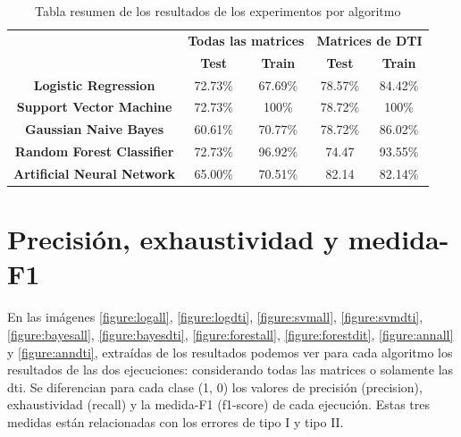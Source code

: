 \begin{table}[H]
\centering
\begin{tabular}{c|c|c|c|c|}
\cline{2-5}
                                        & \multicolumn{2}{c|}{\textbf{Todas las matrices}} & \multicolumn{2}{c|}{\textbf{Matrices de DTI}} \\ \cline{2-5} 
                                        & \textbf{Test}          & \textbf{Train}          & \textbf{Test}         & \textbf{Train}        \\ \hline
\multicolumn{1}{|c|}{\textbf{Logistic Regression}} & 72.73\%                & 67.69\%                 & 78.57\%               & 84.42\%               \\ \hline
\multicolumn{1}{|c|}{\textbf{Support Vector Machine}}      & 72.73\%                & 100\%                   & 78.72\%               & 100\%                 \\ \hline
\multicolumn{1}{|c|}{\textbf{Gaussian Naive Bayes}}    & 60.61\%                & 70.77\%                 & 78.72\%               & 86.02\%               \\ \hline
\multicolumn{1}{|c|}{\textbf{Random Forest Classifier}}   & 72.73\%                & 96.92\%                 & 74.47                 & 93.55\%               \\ \hline
\multicolumn{1}{|c|}{\textbf{Artificial Neural Network}}      & 65.00\%                & 70.51\%                 & 82.14                 & 82.14\%               \\ \hline
\end{tabular}
\caption{Tabla resumen de los resultados de los experimentos por algoritmo}
\label{table:resultados}

\end{table}

\section{Precisión,  exhaustividad y  medida-F1}

En las imágenes 
\ref{figure:logall}, 
\ref{figure:logdti}, 
\ref{figure:svmall}, 
\ref{figure:svmdti}, 
\ref{figure:bayesall}, 
\ref{figure:bayesdti},
\ref{figure:forestall},
\ref{figure:forestdit},
\ref{figure:annall} y
\ref{figure:anndti},
 extraídas de los resultados podemos ver para cada algoritmo los resultados de las dos ejecuciones: considerando todas las matrices o solamente las \gls{dti}. Se diferencian para cada clase (1, 0) los valores de precisión (precision), exhaustividad (recall) y la medida-F1 (f1-score) de cada ejecución. Estas tres medidas están relacionadas con los errores de tipo I y tipo II. 

